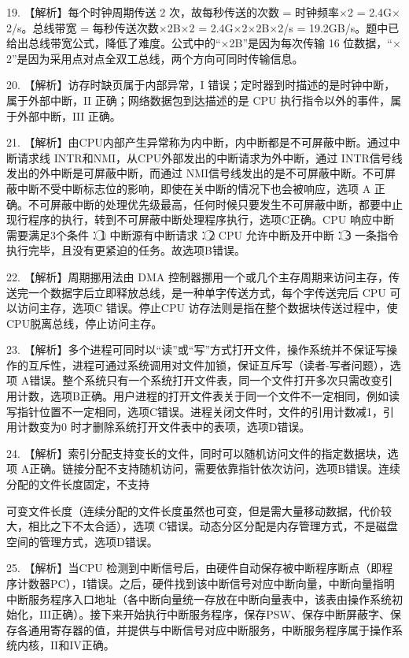 \documentclass[UTF8,11pt]{ctexart}
\begin{document}
19. 【解析】每个时钟周期传送 2 次，故每秒传送的次数 = 时钟频率\(\displaystyle \times\)2 = 2.4G\(\displaystyle \times\)2/s。总线带宽 = 每秒传送次数\(\displaystyle \times\)2B\(\displaystyle \times\)2 = 2.4G\(\displaystyle \times\)2\(\displaystyle \times\)2B\(\displaystyle \times\)2/s = 19.2GB/s。题中已给出总线带宽公式，降低了难度。公式中的“\(\displaystyle \times\)2B”是因为每次传输 16 位数据，“\(\displaystyle \times\)2”是因为采用点对点全双工总线，两个方向可同时传输信息。


20. 【解析】访存时缺页属于内部异常，\(\displaystyle \mathrm{I}\) 错误；定时器到时描述的是时钟中断，属于外部中断，\(\displaystyle \mathrm{II}\) 正确；网络数据包到达描述的是 CPU 执行指令以外的事件，属于外部中断，\(\displaystyle \mathrm{III}\) 正确。


21. 【解析】由CPU内部产生异常称为内中断，内中断都是不可屏蔽中断。通过中断请求线 INTR和NMI，从CPU外部发出的中断请求为外中断，通过 INTR信号线发出的外中断是可屏蔽中断，而通过 NMI信号线发出的是不可屏蔽中断。不可屏蔽中断不受中断标志位的影响，即使在关中断的情况下也会被响应，选项 A 正确。不可屏蔽中断的处理优先级最高，任何时候只要发生不可屏蔽中断，都要中止现行程序的执行，转到不可屏蔽中断处理程序执行，选项C正确。CPU 响应中断需要满足3个条件：\textcircled{1} 中断源有中断请求：\textcircled{2} CPU 允许中断及开中断：\textcircled{3} 一条指令执行完毕，且没有更紧迫的任务。故选项B错误。


22. 【解析】周期挪用法由 DMA 控制器挪用一个或几个主存周期来访问主存，传送完一个数据字后立即释放总线，是一种单字传送方式，每个字传送完后 CPU 可以访问主存，选项C 错误。停止CPU 访存法则是指在整个数据块传送过程中，使CPU脱离总线，停止访问主存。


23. 【解析】多个进程可同时以“读”或“写”方式打开文件，操作系统并不保证写操作的互斥性，进程可通过系统调用对文件加锁，保证互斥写（读者-写者问题），选项 A错误。整个系统只有一个系统打开文件表，同一个文件打开多次只需改变引用计数，选项B正确。用户进程的打开文件表关于同一个文件不一定相同，例如读写指针位置不一定相同，选项C错误。进程关闭文件时，文件的引用计数减1，引用计数变为0 时才删除系统打开文件表中的表项，选项D错误。


24. 【解析】索引分配支持变长的文件，同时可以随机访问文件的指定数据块，选项 A正确。链接分配不支持随机访问，需要依靠指针依次访问，选项B错误。连续分配的文件长度固定，不支持


可变文件长度（连续分配的文件长度虽然也可变，但是需大量移动数据，代价较大，相比之下不太合适），选项 C错误。动态分区分配是内存管理方式，不是磁盘空间的管理方式，选项D错误。


25. 【解析】当CPU 检测到中断信号后，由硬件自动保存被中断程序断点（即程序计数器PC），\(\displaystyle \mathrm{I}\)错误。之后，硬件找到该中断信号对应中断向量，中断向量指明中断服务程序入口地址（各中断向量统一存放在中断向量表中，该表由操作系统初始化，\(\displaystyle \mathrm{III}\)正确）。接下来开始执行中断服务程序，保存PSW、保存中断屏蔽字、保存各通用寄存器的值，并提供与中断信号对应中断服务，中断服务程序属于操作系统内核，\(\displaystyle \mathrm{II}\)和\(\displaystyle \mathrm{IV}\)正确。
\end{document}
